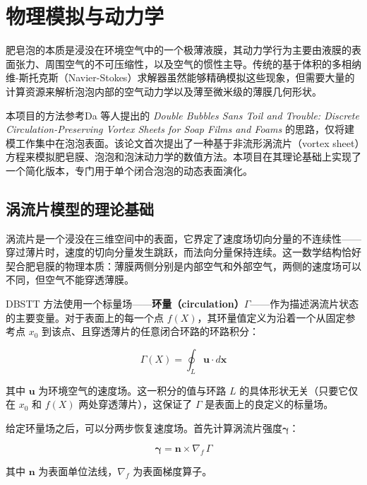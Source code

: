 
\chapter{物理模拟与动力学}


肥皂泡的本质是浸没在环境空气中的一个极薄液膜，其动力学行为主要由液膜的表面张力、周围空气的不可压缩性，以及空气的惯性主导。传统的基于体积的多相纳维-斯托克斯（Navier-Stokes）求解器虽然能够精确模拟这些现象，但需要大量的计算资源来解析泡泡内部的空气动力学以及薄至微米级的薄膜几何形状。

本项目的方法参考Da 等人提出的 \textit{Double Bubbles Sans Toil and Trouble: Discrete Circulation-Preserving Vortex Sheets for Soap Films and Foams} \cite{da2015doublebubbles}的思路，仅将建模工作集中在泡泡表面。该论文首次提出了一种基于非流形涡流片（vortex sheet）方程来模拟肥皂膜、泡泡和泡沫动力学的数值方法。本项目在其理论基础上实现了一个简化版本，专门用于单个闭合泡泡的动态表面演化。

\section{涡流片模型的理论基础}

涡流片是一个浸没在三维空间中的表面，它界定了速度场切向分量的不连续性——穿过薄片时，速度的切向分量发生跳跃，而法向分量保持连续。这一数学结构恰好契合肥皂膜的物理本质：薄膜两侧分别是内部空气和外部空气，两侧的速度场可以不同，但空气不能穿透薄膜。

DBSTT 方法使用一个标量场——\textbf{环量（circulation）}$\Gamma$——作为描述涡流片状态的主要变量。对于表面上的每一个点 $f(X)$，其环量值定义为沿着一个从固定参考点 $x_0$ 到该点、且穿透薄片的任意闭合环路的环路积分：

\begin{equation}
\Gamma(X) = \oint_L \mathbf{u} \cdot d\mathbf{x}
\label{eq:circulation_def}
\end{equation}

其中 $\mathbf{u}$ 为环境空气的速度场。这一积分的值与环路 $L$ 的具体形状无关（只要它仅在 $x_0$ 和 $f(X)$ 两处穿透薄片），这保证了 $\Gamma$ 是表面上的良定义的标量场。

给定环量场之后，可以分两步恢复速度场。首先计算涡流片强度$\boldsymbol{\gamma}$：

\begin{equation}
\boldsymbol{\gamma} = \mathbf{n} \times \nabla_{\!f}\, \Gamma
\label{eq:vortex_sheet_strength}
\end{equation}

其中 $\mathbf{n}$ 为表面单位法线，$\nabla_{\!f}$ 为表面梯度算子。


